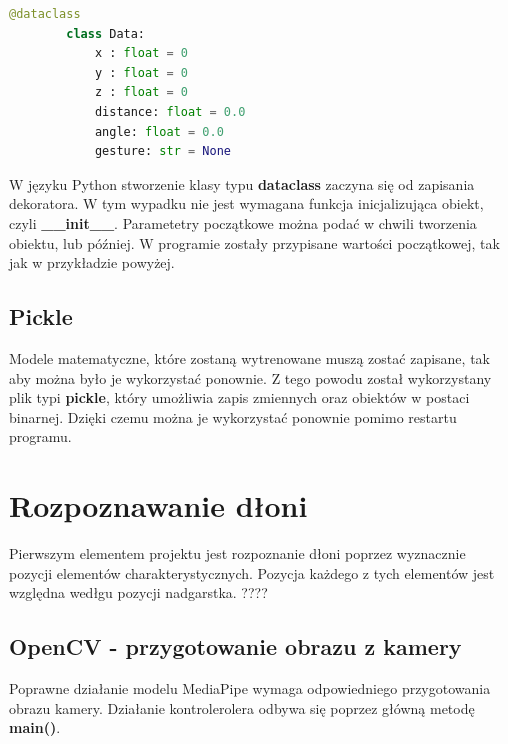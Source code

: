     \begin{lstlisting}[language=python]
        @dataclass
        class Data:
            x : float = 0
            y : float = 0
            z : float = 0
            distance: float = 0.0
            angle: float = 0.0
            gesture: str = None
    \end{lstlisting}

    \quad W języku Python stworzenie klasy typu \textbf{dataclass} zaczyna się od zapisania dekoratora. W tym wypadku nie jest wymagana funkcja inicjalizująca obiekt, czyli \textbf{\_\_init\_\_}. Parametetry początkowe można podać w chwili tworzenia obiektu, lub później. W programie zostały przypisane wartości początkowej, tak jak w przykładzie powyżej. 

    \subsection{Pickle}
    \quad Modele matematyczne, które zostaną wytrenowane muszą zostać zapisane, tak aby można było je wykorzystać ponownie. Z tego powodu został wykorzystany plik typi \textbf{pickle}, który umożliwia zapis zmiennych oraz obiektów w postaci binarnej. Dzięki czemu można je wykorzystać ponownie pomimo restartu programu. 

    \section{Rozpoznawanie dłoni}
    
    \quad Pierwszym elementem projektu jest rozpoznanie dłoni poprzez wyznacznie pozycji elementów charakterystycznych. Pozycja każdego z tych elementów jest względna wedłgu pozycji nadgarstka. ????



    \subsection{OpenCV - przygotowanie obrazu z kamery}
    
    \quad Poprawne działanie modelu MediaPipe wymaga odpowiedniego przygotowania obrazu kamery. Działanie kontrolerolera odbywa się poprzez główną metodę \textbf{main()}.
    
